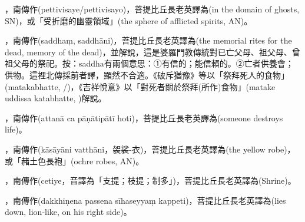 \startitemgroup[noteitems]
\item{}，南傳作(pettivisaye/pettivisayo)，菩提比丘長老英譯為(in the domain of ghosts, SN)，或「受折磨的幽靈領域」(the sphere of afflicted spirits, AN)。
\stopitemgroup

\startitemgroup[noteitems]
\item{}，南傳作(saddhaṃ, saddhāni)，菩提比丘長老英譯為(the memorial rites for the dead, memory of the dead)，並解說，這是婆羅門教傳統對已亡父母、祖父母、曾祖父母的祭祀。按：saddha有兩個意思：➀有信的；能信賴的。➁亡者供養會；供物。這裡北傳採前者譯，顯然不合適。《破斥猶豫》等以「祭拜死人的食物」(matakabhatte, /)，《吉祥悅意》以「對死者關於祭拜(所作)食物」(matake uddissa katabhatte, )解說。
\stopitemgroup

\startitemgroup[noteitems]
\item{}，南傳作(attanā ca pāṇātipātī hoti)，菩提比丘長老英譯為(someone destroys life)。
\stopitemgroup

\startitemgroup[noteitems]
\item{}，南傳作(kāsāyāni vatthāni，袈裟-衣)，菩提比丘長老英譯為(the yellow robe)，或「赭土色長袍」(ochre robes, AN)。
\stopitemgroup

\startitemgroup[noteitems]
\item{}，南傳作(cetiye，音譯為「支提；枝提；制多」)，菩提比丘長老英譯為(Shrine)。
\stopitemgroup

\startitemgroup[noteitems]
\item{}，南傳作(dakkhiṇena passena sīhaseyyaṃ kappeti)，菩提比丘長老英譯為(lies down, lion-like, on his right side)。
\stopitemgroup

